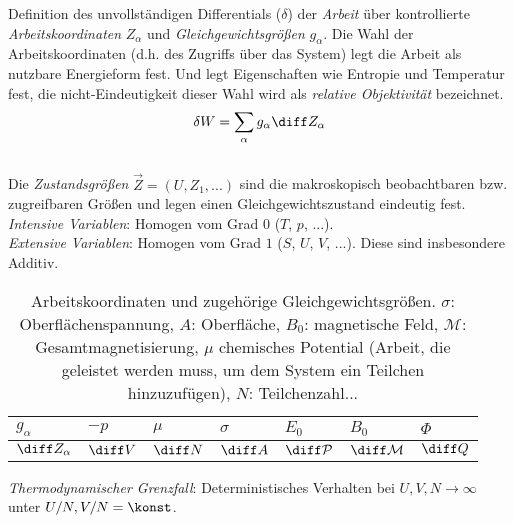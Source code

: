 \documentclass[11pt]{article}
\numberwithin{equation}{section}
\begin{document}
        Definition des unvollständigen Differentials ($\delta$) der \emph{Arbeit} über kontrollierte \emph{Arbeitskoordinaten} $Z_\alpha$ und \emph{Gleichgewichtsgrößen} $g_\alpha$. Die Wahl der Arbeitskoordinaten (d.h. des Zugriffs über das System) legt die Arbeit als nutzbare Energieform fest. Und legt Eigenschaften wie Entropie und Temperatur fest, die nicht-Eindeutigkeit dieser Wahl wird als \emph{relative Objektivität} bezeichnet.
        \begin{equation}
          \delta W = \sum_\alpha g_\alpha \diff Z_\alpha
        \end{equation}\\

        Die \emph{Zustandsgrößen} $\vec{Z}=\left(U, Z_1,... \right)$ sind die makroskopisch beobachtbaren bzw. zugreifbaren Größen und legen einen Gleichgewichtszustand eindeutig fest.\\

        \emph{Intensive Variablen}: Homogen vom Grad $0$ ($T$, $p$, ...).\\

        \emph{Extensive Variablen}: Homogen vom Grad $1$ ($S$, $U$, $V$, ...). Diese sind insbesondere Additiv.\\

        \begin{table}[h]
          \begin{center}
          \begin{tabular}{ l | l l l l l l }
            $g_\alpha$ & $-p$ & $\mu$ & $\sigma$ & $E_0$ & $B_0$ & $\Phi$ \\ \hline
            $\diff Z_\alpha$ & $\diff V$ & $\diff N$ & $\diff A$ & $\diff \mathcal{P}$ & $\diff \mathcal{M}$ & $\diff Q$ \\
            \end{tabular}
          \caption{Arbeitskoordinaten und zugehörige Gleichgewichtsgrößen. $\sigma$: Oberflächenspannung, $A$: Oberfläche, $B_0$: magnetische Feld, $\mathcal{M}$: Gesamtmagnetisierung, $\mu$ chemisches Potential (Arbeit, die geleistet werden muss, um dem System ein Teilchen hinzuzufügen), $N$: Teilchenzahl...}
          \label{tab:ArbeitskoordinatenUndGleichgewichtsgroessen}
          \end{center}
        \end{table}

        \emph{Thermodynamischer Grenzfall}: Deterministisches Verhalten bei $U,V,N\rightarrow\infty$ unter $U/N,V/N=\konst$. \\
\end{document}
